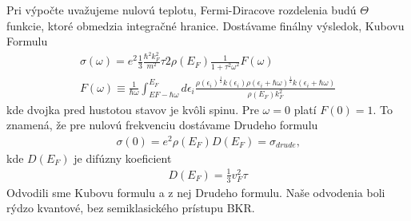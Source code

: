Pri výpočte uvažujeme nulovú teplotu, Fermi-Diracove rozdelenia budú $\Theta$ funkcie, ktoré obmedzia integračné hranice. Dostávame finálny výsledok, Kubovu Formulu
\begin{align}
\label{eq:03kubo}
\sigma(\omega)=e^2\frac{1}{3}\frac{\hbar^2k_F^2}{m^2}\tau 2\rho(E_F)\frac{1}{1+\tau^2\omega^2}F(\omega)\\
F(\omega)\equiv\frac{1}{\hbar\omega}\int_{EF-\hbar\omega}^{E_F}d\epsilon_i \frac{\rho(\epsilon_i)^{\frac{1}{2}}k(\epsilon_i)\rho(\epsilon_i+\hbar\omega)^{\frac{1}{2}}k(\epsilon_i+\hbar\omega)}{\rho(E_F)k_F^2}
\end{align}
kde dvojka pred hustotou stavov je kvôli spinu. Pre $\omega=0$ platí $F(0)=1$. To znamená, že pre nulovú frekvenciu dostávame Drudeho formulu
\begin{align}
\sigma(0)=e^2\rho(E_F)D(E_F)=\sigma_{drude} \text{,}
\end{align}
kde $D(E_F)$ je difúzny koeficient
\begin{align}
D(E_F)=\frac{1}{3}v_F^2\tau
\end{align}
Odvodili sme Kubovu formulu a z nej Drudeho formulu. Naše odvodenia boli rýdzo kvantové, bez semiklasického prístupu BKR. 
